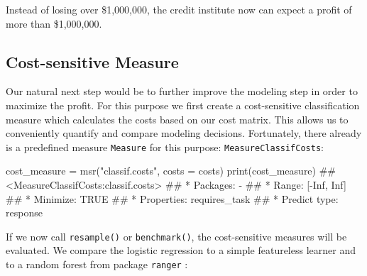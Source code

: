 \documentclass[
  11pt,
  parskip=half,
  DIV=calc,
  BCOR=10mm,
  x11names]{scrbook}
\newenvironment{Shaded}{}{}
\newcommand{\DataTypeTok}[1]{#1}
\newcommand{\DecValTok}[1]{#1}
\newcommand{\KeywordTok}[1]{\textcolor[rgb]{0.00,0.00,1.00}{#1}}
\newcommand{\NormalTok}[1]{#1}
\newcommand{\OperatorTok}[1]{#1}
\newcommand{\StringTok}[1]{\textcolor[rgb]{0.00,0.50,0.50}{#1}}
\begin{document}
Instead of losing over \$1,000,000, the credit institute now can expect a profit of more than \$1,000,000.

\hypertarget{cost-sensitive-measure}{%
\subsection{Cost-sensitive Measure}\label{cost-sensitive-measure}}

Our natural next step would be to further improve the modeling step in order to maximize the profit.
For this purpose we first create a cost-sensitive classification measure which calculates the costs based on our cost matrix.
This allows us to conveniently quantify and compare modeling decisions.
Fortunately, there already is a predefined measure \texttt{Measure} for this purpose: \texttt{MeasureClassifCosts}:

\begin{Shaded}
\begin{Highlighting}[]
\NormalTok{cost_measure =}\StringTok{ }\KeywordTok{msr}\NormalTok{(}\StringTok{"classif.costs"}\NormalTok{, }\DataTypeTok{costs =}\NormalTok{ costs)}
\KeywordTok{print}\NormalTok{(cost_measure)}
\NormalTok{## <MeasureClassifCosts:classif.costs>}
\NormalTok{## * Packages: -}
\NormalTok{## * Range: [-Inf, Inf]}
\NormalTok{## * Minimize: TRUE}
\NormalTok{## * Properties: requires_task}
\NormalTok{## * Predict type: response}
\end{Highlighting}
\end{Shaded}

If we now call \texttt{resample()} or \texttt{benchmark()}, the cost-sensitive measures will be evaluated.
We compare the logistic regression to a simple featureless learner and to a random forest from package \texttt{ranger} :

\begin{Shaded}
\end{Shaded}
\end{document}
